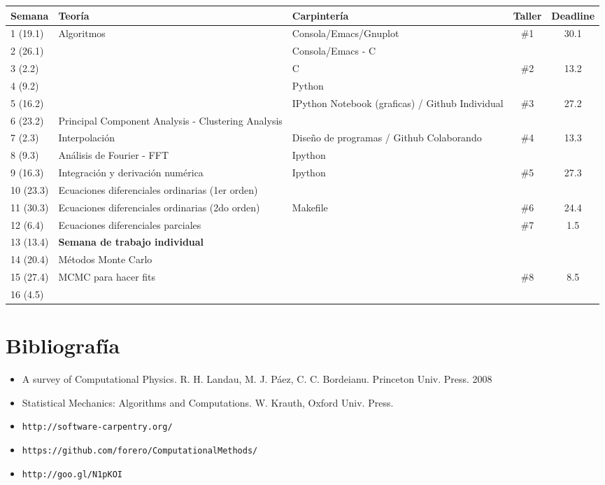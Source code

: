 \documentclass[11pt]{article}
\begin{document}
\begin{center}
\begin{tabular}{|p{1.8cm}|p{6cm}|p{5cm}|c|c|}
\hline
Semana & Teor\'ia & Carpinter\'ia & Taller & Deadline \\\hline
1 (19.1) & Algoritmos	&Consola/Emacs/Gnuplot & \#1 & 30.1\\\hline
2 (26.1)& 	& Consola/Emacs - C  & &\\\hline
3 (2.2)& 	&C  & \#2   & 13.2\\\hline
4 (9.2)& 	&Python &  &\\\hline
5 (16.2)& 	&IPython Notebook (graficas) / Github Individual & \#3 & 27.2\\\hline
6 (23.2)&      Principal Component Analysis - Clustering Analysis &  & &\\\hline
7 (2.3)&  Interpolaci\'on & Dise\~no de programas / Github Colaborando & \#4 & 13.3\\ \hline
8 (9.3)& An\'alisis de Fourier - FFT &  Ipython & & \\\hline
9 (16.3) & Integraci\'on y derivaci\'on num\'erica & Ipython & \#5 &27.3\\\hline
10 (23.3) & Ecuaciones diferenciales ordinarias (1er orden)& & &  \\\hline
11 (30.3)& Ecuaciones diferenciales ordinarias (2do orden)&  Makefile &  \#6 & 24.4\\\hline 
12 (6.4) & Ecuaciones diferenciales parciales & & \#7 & 1.5\\\hline
13 (13.4) & {\bf Semana de trabajo individual} & & &\\\hline 
14 (20.4) & M\'etodos Monte Carlo &   &  & \\\hline
15 (27.4) & MCMC para hacer fits &    & \#8 & 8.5\\\hline
16 (4.5) &  &    &  & \\\hline
\hline
\end{tabular}
\end{center}


\section*{Bibliograf\'ia}
\begin{itemize}
\item
A survey of Computational Physics. R. H. Landau, M. J. P\'aez, C. C.
Bordeianu. Princeton Univ. Press. 2008 
\item
Statistical Mechanics: Algorithms and Computations. W. Krauth, Oxford Univ. Press. 
\item\verb"http://software-carpentry.org/"
\item\verb"https://github.com/forero/ComputationalMethods/"
\item\verb"http://goo.gl/N1pKOI"
\end{itemize}

 
\end{document}
